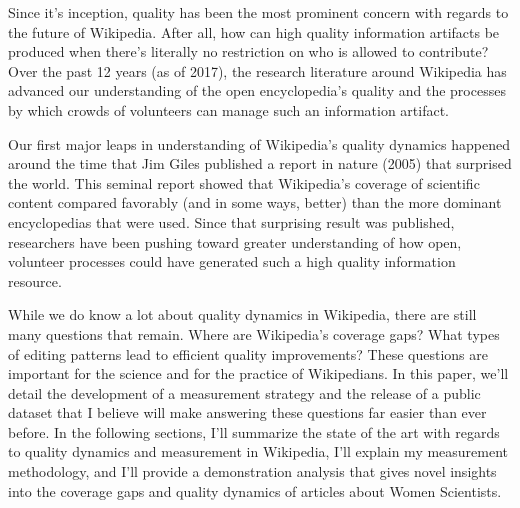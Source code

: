 Since it's inception, quality has been the most prominent concern with regards to the future of Wikipedia. After all, how can high quality information artifacts be produced when there's literally no restriction on who is allowed to contribute? Over the past 12 years (as of 2017), the research literature around Wikipedia has advanced our understanding of the open encyclopedia's quality and the processes by which crowds of volunteers can manage such an information artifact.

Our first major leaps in understanding of Wikipedia's quality dynamics happened around the time that Jim Giles published a report in nature (2005)\cite{giles05internet} that surprised the world. This seminal report showed that Wikipedia's coverage of scientific content compared favorably (and in some ways, better) than the more dominant encyclopedias that were used. Since that surprising result was published, researchers have been pushing toward greater understanding of how open, volunteer processes could have generated such a high quality information resource.

While we do know a lot about quality dynamics in Wikipedia, there are still many questions that remain. Where are Wikipedia's coverage gaps? What types of editing patterns lead to efficient quality improvements? These questions are important for the science and for the practice of Wikipedians. In this paper, we'll detail the development of a measurement strategy and the release of a public dataset that I believe will make answering these questions far easier than ever before. In the following sections, I'll summarize the state of the art with regards to quality dynamics and measurement in Wikipedia, I'll explain my measurement methodology, and I'll provide a demonstration analysis that
gives novel insights into the coverage gaps and quality dynamics of articles about Women Scientists.
